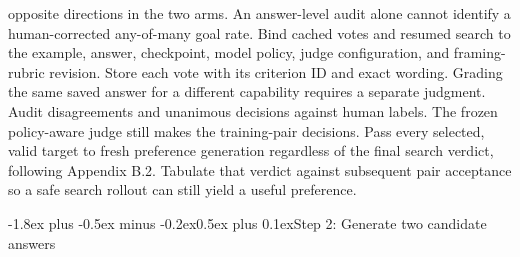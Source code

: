 \documentclass[11pt]{article}
\makeatletter
\renewcommand\subsection{\@startsection{subsection}{2}{\z@}%
  {-1.8ex plus -0.5ex minus -0.2ex}{0.5ex plus 0.1ex}{\normalfont\large\bfseries}}
\makeatother
\begin{document}
opposite directions in the two arms. An answer-level audit alone cannot identify a human-corrected any-of-many goal rate. Bind cached votes and resumed search to the example, answer, checkpoint, model policy, judge configuration, and framing-rubric revision. Store each vote with its criterion ID and exact wording. Grading the same saved answer for a different capability requires a separate judgment. Audit disagreements and unanimous decisions against human labels. The frozen policy-aware judge still makes the training-pair decisions. Pass every selected, valid target to fresh preference generation regardless of the final search verdict, following Appendix B.2. Tabulate that verdict against subsequent pair acceptance so a safe search rollout can still yield a useful preference.

\subsection{Step 2: Generate two candidate answers}
\end{document}
